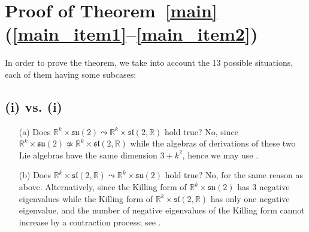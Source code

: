 \documentclass[
reqno]{amsart}
\begin{document}
\section{Proof of Theorem~\ref{main}(\eqref{main_item1}--\eqref{main_item2})}\label{Sect4}

In order to prove the theorem, we take into account the 13 possible situations, 
each of them having some subcases: 

\subsection{(i) vs. (i)}\label{Case0}  
\begin{itemize}
\item[(a)] Does ${{\mathbb R}}^k\times{{\mathfrak s}{\mathfrak u}}(2){\leadsto}{{\mathbb R}}^k\times {{\mathfrak s}{\mathfrak l}}(2,{{\mathbb R}})$ hold true? 
 No, since 
${{\mathbb R}}^k\times{{\mathfrak s}{\mathfrak u}}(2)\not\simeq{{\mathbb R}}^k\times {{\mathfrak s}{\mathfrak l}}(2,{{\mathbb R}})$ while the algebras of derivations 
of these two Lie algebras have the same dimension $3+k^2$, hence we may use \cite[Th. 1(1)]{NP06}. 
\item[(b)] Does ${{\mathbb R}}^k\times{{\mathfrak s}{\mathfrak l}}(2,{{\mathbb R}}){\leadsto}{{\mathbb R}}^k\times {{\mathfrak s}{\mathfrak u}}(2)$ hold true? 
 No, for the same reason as above. 
Alternatively, since the Killing form of ${{\mathbb R}}^k\times {{\mathfrak s}{\mathfrak u}}(2)$ has 3 negative eigenvalues 
while the Killing form of ${{\mathbb R}}^k\times{{\mathfrak s}{\mathfrak l}}(2,{{\mathbb R}})$ has only one negative eigenvalue, 
and the number of negative eigenvalues of the Killing form cannot increase by a contraction process; 
see \cite[Th. 1(16)]{NP06}. 
\end{itemize}
\end{document}
